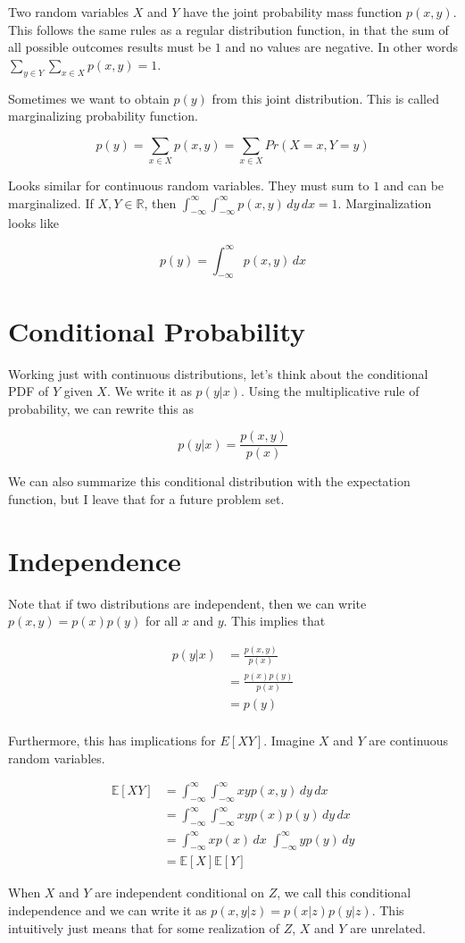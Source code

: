 \documentclass{article} %
\newcommand*\red{\color{red}}  %
\newcommand{\E}{\mathbb{E}}    %
\begin{document}
Two random variables $X$ and $Y$ have the {\red joint probability mass function} $p(x, y)$. This follows the same rules as a regular distribution function, in that the sum of all possible outcomes results must be $1$ and no values are negative. In other words $\sum_{y \in Y} \sum_{x \in X} p(x, y) = 1$.

Sometimes we want to obtain $p(y)$ from this joint distribution. This is called {\red marginalizing} probability function.

\[
p(y) = \sum_{x \in X} p(x, y) = \sum_{x \in X} Pr(X = x, Y = y)
\]

Looks similar for continuous random variables. They must sum to $1$ and can be marginalized. If $X, Y \in \mathbb{R}$, then $\int_{-\infty}^\infty \int_{-\infty}^\infty p(x, y)\,dy\,dx = 1$. Marginalization looks like

\[
p(y) =  \int_{-\infty}^\infty p(x, y)\,dx
\]

\section{Conditional Probability}

Working just with continuous distributions, let's think about the conditional PDF of $Y$ given $X$. We write it as $p(y|x)$. Using the multiplicative rule of probability, we can rewrite this as

\[
p(y|x) = \frac{p(x, y)}{p(x)}
\]

We can also summarize this conditional distribution with the expectation function, but I leave that for a future problem set.

\section{Independence}

Note that if two distributions are {\red independent}, then we can write $p(x, y) = p(x)p(y)$ for all $x$ and $y$. This implies that

\begin{align*}
p(y|x) &= \frac{p(x, y)}{p(x)} \\
&= \frac{p(x)p(y)}{p(x)} \\
&= p(y) \\
\end{align*}

Furthermore, this has implications for $E[XY]$. Imagine $X$ and $Y$ are continuous random variables.

\begin{align*}
\E[XY] &= \int_{-\infty}^\infty \int_{-\infty}^\infty xyp(x,y) \, dy \, dx \\
&= \int_{-\infty}^\infty \int_{-\infty}^\infty xyp(x)p(y) \, dy \, dx \\
&= \int_{-\infty}^\infty xp(x)\, dx\,\, \int_{-\infty}^\infty yp(y) \, dy \\
&= \E[X]\E[Y]
\end{align*}

When $X$ and $Y$ are independent conditional on $Z$, we call this {\red conditional independence} and we can write it as $p(x, y |z) = p(x|z) p(y|z)$. This intuitively just means that for some realization of $Z$, $X$ and $Y$ are unrelated.
\end{document}
